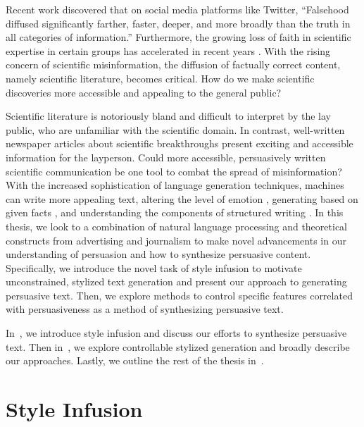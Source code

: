 Recent work discovered that on social media platforms like Twitter, ``Falsehood diffused significantly farther, faster, deeper, and more broadly than the truth in all categories of information.'' \citep{vosoughi2018spread}  Furthermore, the growing loss of faith in scientific expertise in certain groups has accelerated in recent years \citep{gauchat2012politicization}. With the rising concern of scientific misinformation, the diffusion of factually correct content, namely scientific literature, becomes critical. How do we make scientific discoveries more accessible and appealing to the general public? 

Scientific literature is notoriously bland and difficult to interpret by the lay public, who are unfamiliar with the scientific domain. In contrast, well-written newspaper articles about scientific breakthroughs present exciting and accessible information for the layperson. Could more accessible, persuasively written scientific communication be one tool to combat the spread of misinformation? With the increased sophistication of language generation techniques, machines can write more appealing text, altering the level of emotion \citep{ghosh-etal-2017-affect, zhou2018emotional}, generating based on given facts \citep{orbach-goldberg-2020-facts2story}, and understanding the components of structured writing \citep{Tambwekar_2019}. In this thesis, we look to a combination of natural language processing and theoretical constructs from advertising and journalism to make novel advancements in our understanding of persuasion and how to synthesize persuasive content. Specifically, we introduce the novel task of style infusion to motivate unconstrained, stylized text generation and present our approach to generating persuasive text. Then, we explore methods to control specific features correlated with persuasiveness as a method of synthesizing persuasive text. 

In~, we introduce style infusion and discuss our efforts to synthesize persuasive text. Then in~, we explore controllable stylized generation and broadly describe our approaches. Lastly, we outline the rest of the thesis in~.


\section{Style Infusion}
\label{sec:intro_style_infusion}

